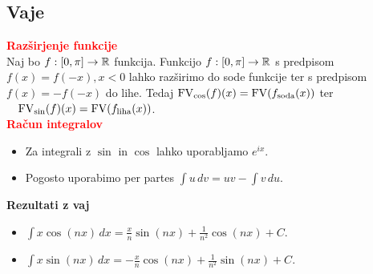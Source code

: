 \documentclass[a4paper,oneside,8pt,landscape]{extarticle}
\begin{document}
\begin{multicols*}{3}
\subsection*{Vaje}
\textbf{\textcolor{red}{Razširjenje funkcije}}\\
Naj bo \(f: [0, \pi] \to \mathbb{R}\) funkcija. Funkcijo \(f: [0, \pi] \to \mathbb{R}\) s predpisom \(f(x) = f(-x), x < 0\) lahko razširimo do sode funkcije ter s predpisom \(f(x) = -f(-x)\) do lihe. Tedaj 
\(\operatorname{FV}_{\cos}(f)(x) = \operatorname{FV}(f_{\text{soda}}(x))\) ter \(\quad \operatorname{FV}_{\sin}(f)(x) = \text{FV}(f_{\text{liha}}(x))\).\\
%
%
\textbf{\textcolor{red}{Račun integralov}}
\begin{itemize}
    \item Za integrali z \(\sin\) in \(\cos\) lahko uporabljamo \(e^{ix}\).
    \item Pogosto uporabimo per partes \(\int u\, dv = uv - \int v\, du\).
\end{itemize}
%
%
\textbf{Rezultati z vaj}
\begin{itemize}
    \item \(\int x \cos(nx) \, dx = \frac{x}{n}\sin(nx) + \frac{1}{n^2} \cos(nx) + C\).
    \item \(\int x \sin(nx)\, dx = -\frac{x}{n} \cos(nx) + \frac{1}{n^2} \sin(nx) + C\).
\end{itemize}
%
%

\end{multicols*}
\end{document}

